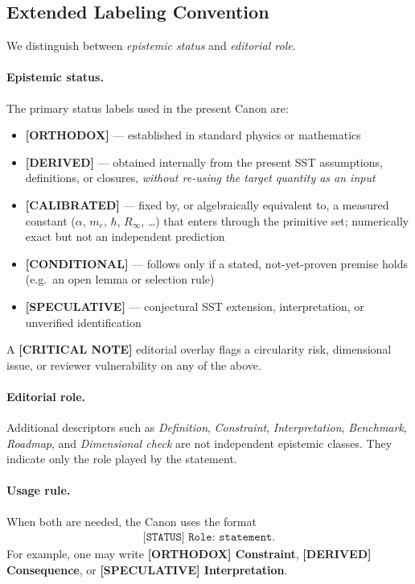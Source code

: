 \documentclass[11pt]{article}
\theoremstyle{definition}
\theoremstyle{plain}
\theoremstyle{remark}
\begin{document}
    \subsection{Extended Labeling Convention}

        We distinguish between \emph{epistemic status} and \emph{editorial role}.

        \paragraph{Epistemic status.}
        The primary status labels used in the present Canon are:
        \begin{itemize}
            \item \textbf{[ORTHODOX]} --- established in standard physics or mathematics
            \item \textbf{[DERIVED]} --- obtained internally from the present SST assumptions, definitions, or closures, \emph{without re-using the target quantity as an input}
            \item \textbf{[CALIBRATED]} --- fixed by, or algebraically equivalent to, a measured constant ($\alpha$, $m_e$, $\hbar$, $R_\infty$, \dots) that enters through the primitive set; numerically exact but not an independent prediction
            \item \textbf{[CONDITIONAL]} --- follows only if a stated, not-yet-proven premise holds (e.g.\ an open lemma or selection rule)
            \item \textbf{[SPECULATIVE]} --- conjectural SST extension, interpretation, or unverified identification
        \end{itemize}
        A \textbf{[CRITICAL NOTE]} editorial overlay flags a circularity risk, dimensional issue, or reviewer vulnerability on any of the above.

        \paragraph{Editorial role.}
        Additional descriptors such as \emph{Definition}, \emph{Constraint}, \emph{Interpretation}, \emph{Benchmark}, \emph{Roadmap}, and \emph{Dimensional check} are not independent epistemic classes. They indicate only the role played by the statement.

        \paragraph{Usage rule.}
        When both are needed, the Canon uses the format
        \begin{align}
            \texttt{[STATUS] Role: statement.}
        \end{align}
        For example, one may write \textbf{[ORTHODOX] Constraint}, \textbf{[DERIVED] Consequence}, or \textbf{[SPECULATIVE] Interpretation}.
    
\end{document}
